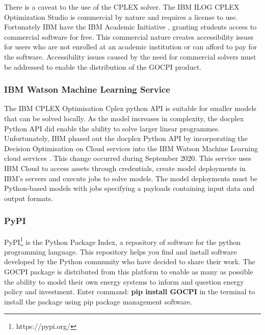 \documentclass[10pt]{article}
\begin{document}
There is a caveat to the use of the CPLEX solver. The IBM ILOG CPLEX Optimization Studio is commercial by nature and requires a license to use.
Fortunately IBM have the IBM Academic Initiative \cite{IBM_AI}, granting students access to commercial software for free.
This commercial nature creates accessibility issues for users who are not enrolled at an academic institution or can afford to pay for the software.
Accessibility issues caused by the need for commercial solvers must be addressed to enable the distribution of the GOCPI product.

\subsubsection{IBM Watson Machine Learning Service}
The IBM CPLEX Optimisation Cplex python API is suitable for smaller models that can be solved locally.
As the model increases in complexity, the docplex Python API did enable the ability to solve larger linear programmes.
Unfortunately, IBM phased out the docplex Python API by incorporating the Decision Optimisation on Cloud services into the IBM Watson Machine Learning cloud services \cite{IBM_WML}.
This change occurred during September 2020.
This service uses IBM Cloud to access assets through credentials, create model deployments in IBM's servers and execute jobs to solve models.
The model deployments must be Python-based models with jobs specifying a payloads containing input data and output formats.

\subsubsection{PyPI}\label{PyPI}
PyPI\footnote{https://pypi.org/} is the Python Package Index, a repository of software for the python programming language.
This repository helps you find and install software developed by the Python community who have decided to share their work.
The GOCPI package is distributed from this platform to enable as many as possible the ability to model their own energy systems to inform and question energy policy and investment.
Enter command: \textbf{pip install GOCPI} in the terminal to install the package using pip package management software.
\end{document}
